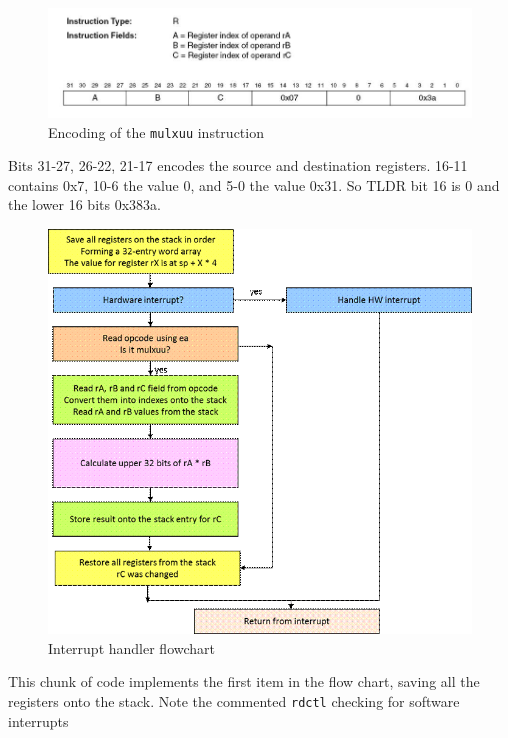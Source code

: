\documentclass[../notes.tex]{subfiles}
\begin{document}
\begin{figure}[H]
	\centering
	\includegraphics[width=0.8\linewidth]{img/image_2022-11-03-14-27-58.png}
	\caption{Encoding of the \texttt{mulxuu} instruction}
\end{figure}

Bits 31-27, 26-22, 21-17 encodes the source and destination registers. 16-11 contains 0x7, 10-6 the value 0, and 5-0 the value 0x31. So TLDR bit 16 is 0 and the lower 16 bits 0x383a.



\begin{figure}[H]
	\centering
	\includegraphics[width=0.8\linewidth]{img/image_2022-11-03-14-30-03.png}
	\caption{Interrupt handler flowchart}
\end{figure}



This chunk of code implements the first item in the flow chart, saving all the registers onto the stack. Note the commented \texttt{rdctl} checking for software interrupts
\end{document}
